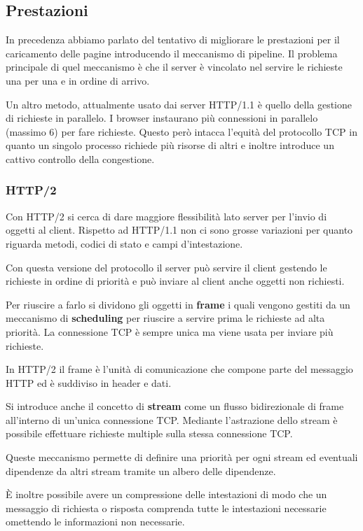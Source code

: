 \subsection{Prestazioni}
In precedenza abbiamo parlato del tentativo di migliorare le 
prestazioni per il caricamento delle pagine introducendo il meccanismo 
di pipeline. Il problema principale di quel meccanismo è che il server 
è vincolato nel servire le richieste una per una e in ordine di arrivo.

Un altro metodo, attualmente usato dai server HTTP/1.1 è quello della 
gestione di richieste in parallelo. I browser instaurano più 
connessioni in parallelo (massimo 6) per fare richieste. Questo però 
intacca l'equità del protocollo TCP in quanto un singolo processo 
richiede più risorse di altri e inoltre introduce un cattivo controllo 
della congestione.

\subsubsection{HTTP/2}
Con HTTP/2 si cerca di dare maggiore flessibilità lato server per 
l'invio di oggetti al client. Rispetto ad HTTP/1.1 non ci sono grosse 
variazioni per quanto riguarda metodi, codici di stato e
campi d'intestazione.

Con questa versione del protocollo il server può servire il client 
gestendo le richieste in ordine di priorità e può inviare al client 
anche oggetti non richiesti.

Per riuscire a farlo si dividono gli oggetti in \textbf{frame} i quali 
vengono gestiti da un meccanismo di \textbf{scheduling} per riuscire a 
servire prima le richieste ad alta priorità. La connessione TCP è 
sempre unica ma viene usata per inviare più richieste.

In HTTP/2 il frame è l'unità di comunicazione che compone parte del 
messaggio HTTP ed è suddiviso in header e dati.

Si introduce anche il concetto di \textbf{stream} come un flusso 
bidirezionale di frame all'interno di un'unica connessione TCP.
Mediante l'astrazione dello stream è possibile effettuare richieste
multiple sulla stessa connessione TCP.

Queste meccanismo permette di definire una priorità per ogni stream ed
eventuali dipendenze da altri stream tramite un albero delle 
dipendenze.

\`E inoltre possibile avere un compressione delle intestazioni di modo 
che un messaggio di richiesta o risposta comprenda tutte le 
intestazioni necessarie omettendo le informazioni non necessarie.

